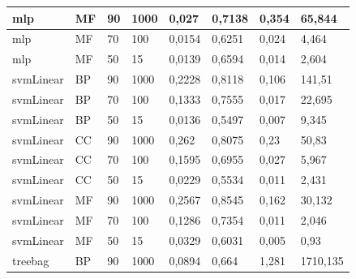 \documentclass[12pt]{report}
\begin{document}
\begin{appendices}
\begin{longtable}[h]{|l|l|l|l|l|l|l|l|}
mlp                & MF            & 90                & 1000               & 0,027          & 0,7138         & 0,354                    & 65,844               \\ \hline
mlp                & MF            & 70                & 100                & 0,0154         & 0,6251         & 0,024                    & 4,464                \\ \hline
mlp                & MF            & 50                & 15                 & 0,0139         & 0,6594         & 0,014                    & 2,604                \\ \hline
svmLinear          & BP            & 90                & 1000               & 0,2228         & 0,8118         & 0,106                    & 141,51               \\ \hline
svmLinear          & BP            & 70                & 100                & 0,1333         & 0,7555         & 0,017                    & 22,695               \\ \hline
svmLinear          & BP            & 50                & 15                 & 0,0136         & 0,5497         & 0,007                    & 9,345                \\ \hline
svmLinear          & CC            & 90                & 1000               & 0,262          & 0,8075         & 0,23                     & 50,83                \\ \hline
svmLinear          & CC            & 70                & 100                & 0,1595         & 0,6955         & 0,027                    & 5,967                \\ \hline
svmLinear          & CC            & 50                & 15                 & 0,0229         & 0,5534         & 0,011                    & 2,431                \\ \hline
svmLinear          & MF            & 90                & 1000               & 0,2567         & 0,8545         & 0,162                    & 30,132               \\ \hline
svmLinear          & MF            & 70                & 100                & 0,1286         & 0,7354         & 0,011                    & 2,046                \\ \hline
svmLinear          & MF            & 50                & 15                 & 0,0329         & 0,6031         & 0,005                    & 0,93                 \\ \hline
treebag            & BP            & 90                & 1000               & 0,0894         & 0,664          & 1,281                    & 1710,135             \\ \hline

\end{longtable}
\end{appendices}
\end{document}
